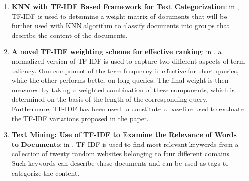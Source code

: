 \documentclass[\main/main.tex]{subfiles}
\begin{document}
\begin{enumerate}
    \item \textbf{KNN with TF-IDF Based Framework for Text Categorization}: in \cite{Trstenjak2014KNNWT}, TF-IDF is used to determine a weight matrix of documents that will be further used with KNN algorithm to classify documents into groups that describe the content of the documents.
    \item \textbf{A novel TF-IDF weighting scheme for effective ranking}: in \cite{Paik2013ANT}, a normalized version of TF-IDF is used to capture two different aspects of term saliency. One component of the term frequency is effective for short queries, while the other performs better on long queries. The final weight is then measured by taking a weighted combination of these components, which is determined on the basis of the length of the corresponding query. Furthermore, TF-IDF has been used to constitute a baseline used to evaluate the TF-IDF variations proposed in the paper.
    \item \textbf{Text Mining: Use of TF-IDF to Examine the Relevance of Words to Documents}: in \cite{Qaiser2018TextMU}, TF-IDF is used to find most relevant keywords from a collection of twenty random websites belonging to four different domains. Such keywords can describe those documents and can be used as tags to categorize the content.
\end{enumerate}
\end{document}
